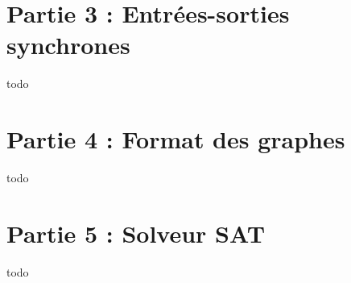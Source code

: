 \documentclass[a4paper]{article}
\begin{document}
\section{Partie 3 : Entrées-sorties synchrones}

todo


\section{Partie 4 : Format des graphes}

todo


\section{Partie 5 : Solveur SAT}

todo

\end{document}
